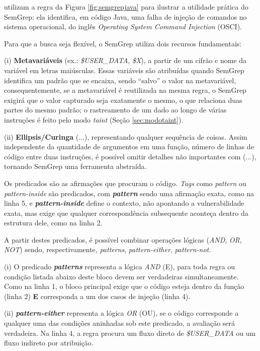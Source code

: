 \documentclass[
    12pt,                %
    openright,           %
    oneside,             %
    a4paper,             %
    english,             %
    brazil               %
]{abntex2}
\begin{document}
\par
{} utilizam a regra da Figura \ref{fig:semgrepjava} para ilustrar a utilidade prática do SemGrep: ela identifica, em código Java, uma falha de injeção de comandos no sistema operacional, do inglês \textit{Operating System Command Injection} (OSCI).
\par
Para que a busca seja flexível, o SemGrep utiliza dois recursos fundamentais: 
\par
(i) \textbf{Metavariáveis} (ex.: \textit{\$USER\_DATA}, \textit{\$X}), a partir de um cifrão e nome da variável em letras maiúsculas.
Essas variáveis são atribuídas quando SemGrep identifica um padrão que se encaixa, sendo ``salvo'' o valor na metavariável, consequentemente, se a metavariável é reutilizada na mesma regra, o SemGrep exigirá que o valor capturado seja exatamente o mesmo, o que relaciona duas partes do mesmo padrão; o rastreamento de um dado ao longo de várias instruções é feito pelo modo \textit{taint} (Seção \ref{sec:modotaint}).
\par
(ii) \textbf{Ellipsis/Curinga} (...), representando qualquer sequência de coisas.
Assim independente da quantidade de argumentos em uma função, número de linhas de código entre duas instruções, é possível omitir detalhes não importantes com (...), tornando SemGrep uma ferramenta abstraída.
\par
Os predicados são as afirmações que procuram o código.
\textit{Tags} como \textit{pattern} ou \textit{pattern-inside} são predicados, com \textit{\textbf{pattern}} sendo uma afirmação exata, como na linha 5, e \textit{\textbf{pattern-inside}} define o contexto, não apontando a vulnerabilidade exata, mas exige que qualquer correspondência subsequente aconteça dentro da estrutura dele, como na linha 2.
\par
A partir destes predicados, é possível combinar operações lógicas (\textit{AND}, \textit{OR}, \textit{NOT}) sendo, respectivamente, \textit{patterns}, \textit{pattern-either}, \textit{pattern-not}.
\par
(i) O predicado \textit{\textbf{patterns}} representa a lógica \textit{AND} (E), para toda regra ou condição listada abaixo deste bloco devem ser verdadeiras simultaneamente.
Como na linha 1, o bloco principal exige que o código esteja dentro da função (linha 2) \textbf{E} corresponda a um dos casos de injeção (linha 4).
\par
(ii) \textbf{\textit{pattern-either}} representa a lógica \textit{OR} (OU), se o código corresponde a qualquer uma das condições aninhadas sob este predicado, a avaliação será verdadeira. Na linha 4, a regra procura um fluxo direto de \textit{\$USER\_DATA} ou um fluxo indireto por atribuição.
\end{document}
